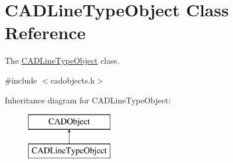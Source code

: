 \hypertarget{class_c_a_d_line_type_object}{}\section{C\+A\+D\+Line\+Type\+Object Class Reference}
\label{class_c_a_d_line_type_object}


The \hyperlink{class_c_a_d_line_type_object}{C\+A\+D\+Line\+Type\+Object} class.  




{\ttfamily \#include $<$cadobjects.\+h$>$}

Inheritance diagram for C\+A\+D\+Line\+Type\+Object\+:\begin{figure}[H]
\begin{center}
\leavevmode
\includegraphics[height=2.000000cm]{class_c_a_d_line_type_object}
\end{center}
\end{figure}
